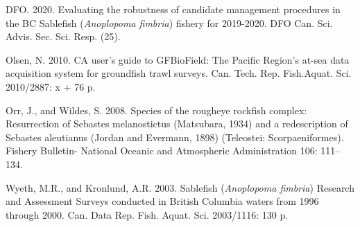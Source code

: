 \documentclass[12pt]{article}\usepackage[]{graphicx}\usepackage[]{color}
\begin{document}
\noindent \vspace{-2em} \setlength{\parindent}{-0.2in} \setlength{\leftskip}{0.2in} \setlength{\parskip}{8pt}

\hypertarget{refs}{}
\begin{CSLReferences}{1}{0}
%
DFO. 2020. Evaluating the robustness of candidate management procedures in the {BC} {S}ablefish ({\emph{Anoplopoma fimbria}}) fishery for 2019-2020. DFO Can. Sci. Advis. Sec. Sci. Resp. (25).

%
Olsen, N. 2010. CA user's guide to {GFBioField: The Pacific Region's} at-sea data acquisition system for groundfish trawl surveys. Can. Tech. Rep. Fish.Aquat. Sci. 2010/2887: x + 76 p.

%
Orr, J., and Wildes, S. 2008. Species of the rougheye rockfish complex: {R}esurrection of {S}ebastes melanostictus ({M}atsubara, 1934) and a redescription of {S}ebastes aleutianus ({J}ordan and {E}vermann, 1898) ({T}eleostei: {S}corpaeniformes). Fishery Bulletin- National Oceanic and Atmospheric Administration 106: 111--134.

%
Wyeth, M.R., and Kronlund, A.R. 2003. Sablefish ({\emph{Anoplopoma fimbria}}) {Research and Assessment Surveys} conducted in {British Columbia} waters from 1996 through 2000. Can. Data Rep. Fish. Aquat. Sci. 2003/1116: 130 p.

\end{CSLReferences}
\end{document}
